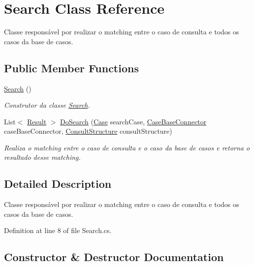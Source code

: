 \hypertarget{class_search}{}\section{Search Class Reference}
\label{class_search}


Classe responsável por realizar o matching entre o caso de consulta e todos os casos da base de casos.  


\subsection*{Public Member Functions}
\begin{DoxyCompactItemize}
\item 
\hyperlink{class_search_a1caef9f0a4ecf2b7ac8b75dd3b0175b2}{Search} ()
\begin{DoxyCompactList}\small\item\em Construtor da classe \hyperlink{class_search}{Search}. \end{DoxyCompactList}\item 
List$<$ \hyperlink{class_result}{Result} $>$ \hyperlink{class_search_ad64beea83d7d2a74950c327ec443daf9}{Do\+Search} (\hyperlink{class_case}{Case} search\+Case, \hyperlink{class_case_base_connector}{Case\+Base\+Connector} case\+Base\+Connector, \hyperlink{class_consult_structure}{Consult\+Structure} consult\+Structure)
\begin{DoxyCompactList}\small\item\em Realiza o matching entre o caso de consulta e o caso da base de casos e retorna o resultado desse matching. \end{DoxyCompactList}\end{DoxyCompactItemize}


\subsection{Detailed Description}
Classe responsável por realizar o matching entre o caso de consulta e todos os casos da base de casos. 



Definition at line 8 of file Search.\+cs.



\subsection{Constructor \& Destructor Documentation}
\hypertarget{class_search_a1caef9f0a4ecf2b7ac8b75dd3b0175b2}{}\label{class_search_a1caef9f0a4ecf2b7ac8b75dd3b0175b2} 
